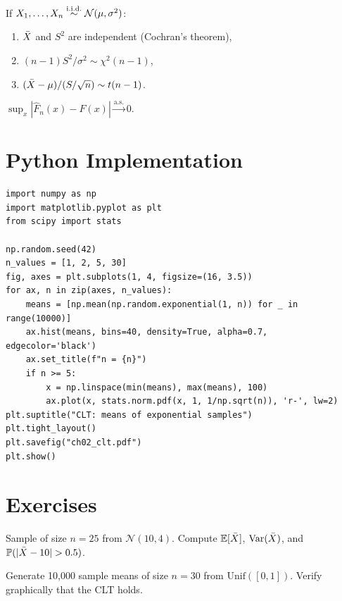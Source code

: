 \begin{theorem}
\label{thm:s2-dist}
If $X_1,\ldots,X_n\overset{\text{i.i.d.}}{\sim}\mathcal{N}(\mu,\sigma^2)$:
\begin{enumerate}
\item $\bar{X}$ and $S^2$ are independent (Cochran's theorem),
\item $(n-1)S^2/\sigma^2\sim\chi^2(n-1)$,
\item $(\bar{X}-\mu)/(S/\sqrt{n})\sim t(n-1)$.
\end{enumerate}
\end{theorem}

\begin{theorem}
$\sup_{x}|\hat{F}_n(x)-F(x)| \xrightarrow{\text{a.s.}} 0$.
\end{theorem}

\section{Python Implementation}

\begin{python}
\begin{verbatim}
import numpy as np
import matplotlib.pyplot as plt
from scipy import stats

np.random.seed(42)
n_values = [1, 2, 5, 30]
fig, axes = plt.subplots(1, 4, figsize=(16, 3.5))
for ax, n in zip(axes, n_values):
    means = [np.mean(np.random.exponential(1, n)) for _ in range(10000)]
    ax.hist(means, bins=40, density=True, alpha=0.7, edgecolor='black')
    ax.set_title(f"n = {n}")
    if n >= 5:
        x = np.linspace(min(means), max(means), 100)
        ax.plot(x, stats.norm.pdf(x, 1, 1/np.sqrt(n)), 'r-', lw=2)
plt.suptitle("CLT: means of exponential samples")
plt.tight_layout()
plt.savefig("ch02_clt.pdf")
plt.show()
\end{verbatim}
\end{python}

\section{Exercises}

\begin{exercise}[$\star$]
Sample of size $n=25$ from $\mathcal{N}(10,4)$. Compute $\mathbb{E}[\bar{X}]$, $\operatorname{Var}(\bar{X})$, and $\Prob(|\xbar-10|>0.5)$.
\end{exercise}

\begin{exercise}[$\star$]
Generate 10,000 sample means of size $n=30$ from $\mathrm{Unif}([0,1])$. Verify graphically that the CLT holds.
\end{exercise}


